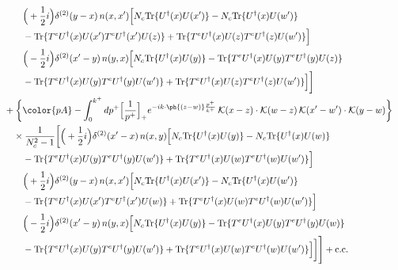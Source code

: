 \begin{align}
&\qquad\quad \Big(+\frac{1}{2}i\Big)\delta^{(2)}(y-x)\,n(x,x')\Big[N_{c}{\rm Tr}\{U^{\dagger}(x)U(x')\}-N_{c}{\rm Tr}\{U^{\dagger}(x)U(w')\}\notag\\
&\qquad\quad -{\rm Tr}\{T^{e}U^{\dagger}(x)U(x')T^{e}U^{\dagger}(x')U(z)\}+{\rm Tr}\{T^{e}U^{\dagger}(x)U(z)T^{e}U^{\dagger}(z)U(w')\}\Big]\notag\\
&\qquad\quad \Big(-\frac{1}{2}i\Big)\delta^{(2)}(x'-y)\,n(y,x)\Big[N_{c}{\rm Tr}\{U^{\dagger}(x)U(y)\}-{\rm Tr}\{T^{e}U^{\dagger}(x)U(y)T^{e}U^{\dagger}(y)U(z)\}\notag\\
&\qquad\quad -{\rm Tr}\{T^{e}U^{\dagger}(x)U(y)T^{e}U^{\dagger}(y)U(w')\}+{\rm Tr}\{T^{e}U^{\dagger}(x)U(z)T^{e}U^{\dagger}(z)U(w')\}\Big]\bigg]\notag\\
&\quad+\bigg\{{\color{pA}-\int_{0}^{k^{+}}dp^{+}\Big[\frac{1}{p^{+}}\Big]_{+}e^{-ik\cdot\ph{(z-w)}\frac{p^{+}}{k^{+}}}\,\mathcal{K}(x-z)\cdot\mathcal{K}(w-z)\,\mathcal{K}(x'-w')\cdot\mathcal{K}(y-w)}\bigg\}\notag\\
&\qquad\times \frac{1}{N_{c}^{2}-1}\bigg[\Big(+\frac{1}{2}i\Big)\delta^{(2)}(x'-x)\,n(x,y)\Big[N_{c}{\rm Tr}\{U^{\dagger}(x)U(y)\}-N_{c}{\rm Tr}\{U^{\dagger}(x)U(w)\}\notag\\
&\qquad\quad -{\rm Tr}\{T^{e}U^{\dagger}(x)U(y)T^{e}U^{\dagger}(y)U(w')\}+{\rm Tr}\{T^{e}U^{\dagger}(x)U(w)T^{e}U^{\dagger}(w)U(w')\}\Big]\notag\\
&\qquad\quad \Big(+\frac{1}{2}i\Big)\delta^{(2)}(y-x)\,n(x,x')\Big[N_{c}{\rm Tr}\{U^{\dagger}(x)U(x')\}-N_{c}{\rm Tr}\{U^{\dagger}(x)U(w')\}\notag\\
&\qquad\quad -{\rm Tr}\{T^{e}U^{\dagger}(x)U(x')T^{e}U^{\dagger}(x')U(w)\}+{\rm Tr}\{T^{e}U^{\dagger}(x)U(w)T^{e}U^{\dagger}(w)U(w')\}\Big]\notag\\
&\qquad\quad \Big(-\frac{1}{2}i\Big)\delta^{(2)}(x'-y)\,n(y,x)\Big[N_{c}{\rm Tr}\{U^{\dagger}(x)U(y)\}-{\rm Tr}\{T^{e}U^{\dagger}(x)U(y)T^{e}U^{\dagger}(y)U(w)\}\notag\\
&\qquad\quad -{\rm Tr}\{T^{e}U^{\dagger}(x)U(y)T^{e}U^{\dagger}(y)U(w')\}+{\rm Tr}\{T^{e}U^{\dagger}(x)U(w)T^{e}U^{\dagger}(w)U(w')\}\Big]\bigg]\Bigg]+{\rm c.c.}\label{eq:E-I.III-2}
\end{align}
